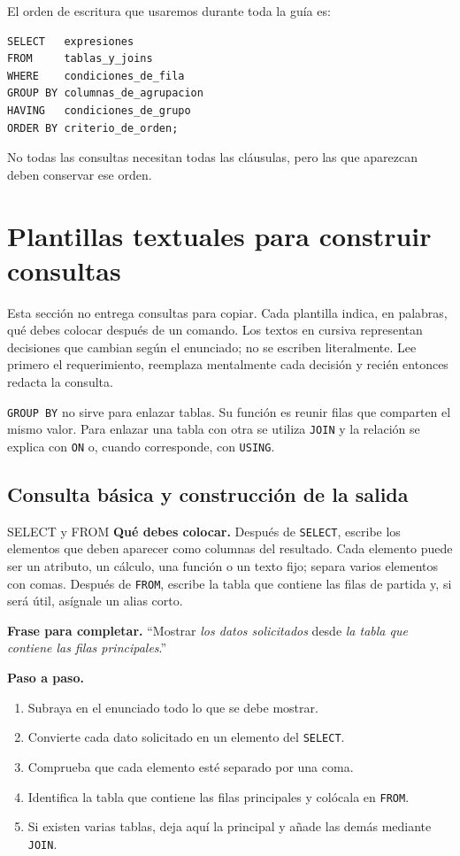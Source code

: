 \documentclass[11pt,a4paper]{article}
\newcommand{\campo}[1]{\texttt{#1}}
\begin{document}
El orden de escritura que usaremos durante toda la guía es:

\begin{lstlisting}
SELECT   expresiones
FROM     tablas_y_joins
WHERE    condiciones_de_fila
GROUP BY columnas_de_agrupacion
HAVING   condiciones_de_grupo
ORDER BY criterio_de_orden;
\end{lstlisting}

No todas las consultas necesitan todas las cláusulas, pero las que aparezcan deben conservar ese
orden.

\section{Plantillas textuales para construir consultas}

Esta sección no entrega consultas para copiar. Cada plantilla indica, en palabras, qué debes colocar
después de un comando. Los textos en cursiva representan decisiones que cambian según el enunciado;
no se escriben literalmente. Lee primero el requerimiento, reemplaza mentalmente cada decisión y
recién entonces redacta la consulta.

\begin{clave}
\campo{GROUP BY} no sirve para enlazar tablas. Su función es reunir filas que comparten el mismo
valor. Para enlazar una tabla con otra se utiliza \campo{JOIN} y la relación se explica con
\campo{ON} o, cuando corresponde, con \campo{USING}.
\end{clave}

\subsection{Consulta básica y construcción de la salida}

\begin{plantilla}{SELECT y FROM}
\textbf{Qué debes colocar.} Después de \campo{SELECT}, escribe los elementos que deben aparecer como
columnas del resultado. Cada elemento puede ser un atributo, un cálculo, una función o un texto fijo;
separa varios elementos con comas. Después de \campo{FROM}, escribe la tabla que contiene las filas
de partida y, si será útil, asígnale un alias corto.

\textbf{Frase para completar.} ``Mostrar \emph{los datos solicitados} desde
\emph{la tabla que contiene las filas principales}.''

\textbf{Paso a paso.}
\begin{enumerate}[label=\arabic*.]
  \item Subraya en el enunciado todo lo que se debe mostrar.
  \item Convierte cada dato solicitado en un elemento del \campo{SELECT}.
  \item Comprueba que cada elemento esté separado por una coma.
  \item Identifica la tabla que contiene las filas principales y colócala en \campo{FROM}.
  \item Si existen varias tablas, deja aquí la principal y añade las demás mediante \campo{JOIN}.
\end{enumerate}
\end{plantilla}
\end{document}
